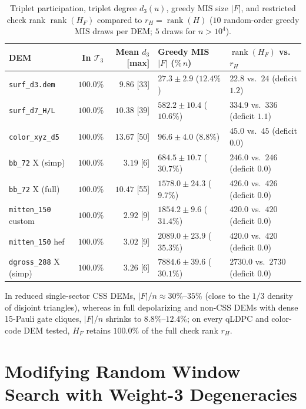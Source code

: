 \documentclass[12pt]{article}
\theoremstyle{definition}
\DeclareMathOperator{\rank}{rank}
\newcommand{\Tc}{\mathcal{T}_3}
\newcommand{\ttt}[1]{\texttt{#1}}
\begin{document}
\begin{table}[htbp]
\centering
\caption{Triplet participation, triplet degree $d_3(u)$, greedy MIS size $|F|$, and restricted check rank
$\rank(H_F)$ compared to $r_H = \rank(H)$ ($10$ random-order greedy MIS draws per DEM; $5$ draws for $n >
10^4$).}\label{tab:mis_anatomy}
\smallskip
\footnotesize
\setlength{\tabcolsep}{3.2pt}
\begin{tabular}{@{}lrrll@{}}
\toprule
DEM & In $\Tc$ & Mean $d_3$ [max] & Greedy MIS $|F|$ ($\%\,n$) & $\rank(H_F)$ vs.\ $r_H$ \\
\midrule
\ttt{surf\_d3.dem} & $100.0\%$ & $9.86$ [33] & $27.3 \pm 2.9$ ($12.4\%$) & $22.8$ vs.\ $24$ (deficit $1.2$) \\
\ttt{surf\_d7\_H/L} & $100.0\%$ & $10.38$ [39] & $582.2 \pm 10.4$ ($10.6\%$) & $334.9$ vs.\ $336$ (deficit $1.1$) \\
\ttt{color\_xyz\_d5} & $100.0\%$ & $13.67$ [50] & $96.6 \pm 4.0$ ($8.8\%$) & $\mathbf{45.0}$ vs.\ $45$ (deficit
  $0.0$) \\
\ttt{bb\_72} X (simp) & $100.0\%$ & $3.19$ [6] & $684.5 \pm 10.7$ ($30.7\%$) & $\mathbf{246.0}$ vs.\ $246$ (deficit
  $0.0$) \\
\ttt{bb\_72} X (full) & $100.0\%$ & $10.47$ [55] & $1578.0 \pm 24.3$ ($9.7\%$) & $\mathbf{426.0}$ vs.\ $426$
  (deficit $0.0$) \\
\ttt{mitten\_150} custom & $100.0\%$ & $2.92$ [9] & $1854.2 \pm 9.6$ ($31.4\%$) & $\mathbf{420.0}$ vs.\ $420$
  (deficit $0.0$) \\
\ttt{mitten\_150} hef & $100.0\%$ & $3.02$ [9] & $2089.0 \pm 23.9$ ($35.3\%$) & $\mathbf{420.0}$ vs.\ $420$ (deficit
  $0.0$) \\
\ttt{dgross\_288} X (simp) & $100.0\%$ & $3.26$ [6] & $7884.6 \pm 39.6$ ($30.1\%$) & $\mathbf{2730.0}$ vs.\ $2730$
  (deficit $0.0$) \\
\bottomrule
\end{tabular}
\end{table}

In reduced single-sector CSS DEMs, $|F|/n \approx 30\%$--$35\%$ (close to the $1/3$ density of disjoint triangles),
whereas in full depolarizing and non-CSS DEMs with dense 15-Pauli gate cliques, $|F|/n$ shrinks to
$8.8\%$--$12.4\%$; on every qLDPC and color-code DEM tested, $H_F$ retains $100.0\%$ of the full check rank $r_H$.

\section{Modifying Random Window Search with Weight-3 Degeneracies}\label{sec:rw_mods}
\end{document}
